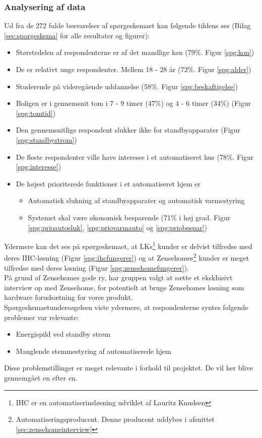 \subsubsection{Analysering af data}
\label{sec:analysedata}
Ud fra de 272 fulde besvarelser af spørgeskemaet kan følgende tildens ses (Bilag \ref{sec:sporgeskema} for alle resultater og figurer):
\begin{itemize}
    \item Størstedelen af respondenterne er af det mandlige køn (79\%. Figur \ref{spg:kon})
    \item De er relativt unge respondenter. Mellem 18 - 28 år (72\%. Figur \ref{spg:alder})
    \item Studerende på videregående uddannelse (58\%. Figur \ref{spg:beskaftigelse})
    \item Boligen er i gennemsnit tom i 7 - 9 timer (47\%) og 4 - 6 timer (34\%) (Figur \ref{spg:tomtid})
    \item Den gennemsnitlige respondent slukker ikke for standbyapparater (Figur \ref{spg:standbystrom})
    \item De fleste respondenter ville have interesse i et automatiseret hus (78\%. Figur \ref{spg:interesse})
    \item De højest prioriterede funktioner i et automatiseret hjem er
    \begin{itemize}
        \item Automatisk slukning af standbyapparater og automatisk varmestyring
        \item Systemet skal være økonomisk besparende (71\% i høj grad. Figur \ref{spg:prioautosluk}, \ref{spg:priovarmauto} og \ref{spg:priobespar})
    \end{itemize}
\end{itemize}
Ydermere kan det ses på spørgeskemaet, at LKs\footnote{IHC er en automatiserinsløsning udviklet af Lauritz Knudsen} kunder er delvist tilfredse med deres IHC-løsning (Figur \ref{spg:ihcfungerer}) og at Zensehomes\footnote{Automatiseringsproducent. Denne producent uddybes i afsnittet \ref{sec:zensehomeinterview}} kunder er meget tilfredse med deres løsning (Figur \ref{spg:zensehomefungerer}). \\ På grund af Zensehomes gode ry, har gruppen valgt at sætte et eksklusivt interview op med Zensehome, for potentielt at bruge Zensehomes løsning som hardware forudsætning for vores produkt. \\

Spørgeskemaetundersøgelsen viste ydermere, at respondenterne syntes følgende problemer var relevante:
\begin{itemize}
    \item Energispild ved standby strøm
    \item Manglende stemmestyring af automatiserede hjem
\end{itemize}
Disse problemstillinger er meget relevante i forhold til projektet. De vil her blive gennemgået en efter en.\\

